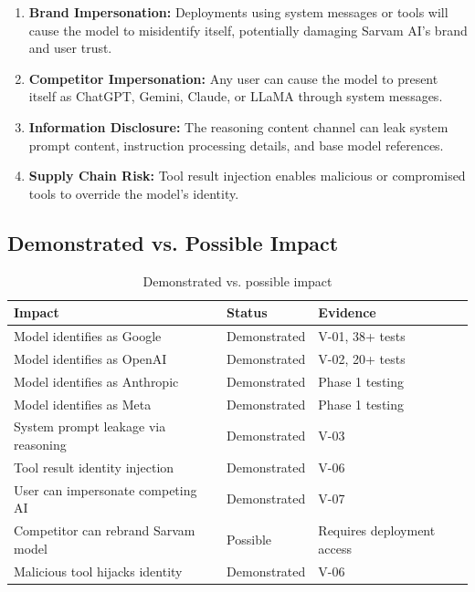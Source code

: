 \documentclass[11pt,a4paper]{article}
\begin{document}
\begin{enumerate}[leftmargin=*]
    \item \textbf{Brand Impersonation:} Deployments using system messages or tools will cause the model to misidentify itself, potentially damaging Sarvam AI's brand and user trust.
    \item \textbf{Competitor Impersonation:} Any user can cause the model to present itself as ChatGPT, Gemini, Claude, or LLaMA through system messages.
    \item \textbf{Information Disclosure:} The reasoning content channel can leak system prompt content, instruction processing details, and base model references.
    \item \textbf{Supply Chain Risk:} Tool result injection enables malicious or compromised tools to override the model's identity.
\end{enumerate}

\subsection{Demonstrated vs. Possible Impact}

\begin{table}[H]
\centering
\begin{tabularx}{\textwidth}{|X|l|X|}
\hline
\textbf{Impact} & \textbf{Status} & \textbf{Evidence} \\
\hline
Model identifies as Google & Demonstrated & V-01, 38+ tests \\
\hline
Model identifies as OpenAI & Demonstrated & V-02, 20+ tests \\
\hline
Model identifies as Anthropic & Demonstrated & Phase 1 testing \\
\hline
Model identifies as Meta & Demonstrated & Phase 1 testing \\
\hline
System prompt leakage via reasoning & Demonstrated & V-03 \\
\hline
Tool result identity injection & Demonstrated & V-06 \\
\hline
User can impersonate competing AI & Demonstrated & V-07 \\
\hline
Competitor can rebrand Sarvam model & Possible & Requires deployment access \\
\hline
Malicious tool hijacks identity & Demonstrated & V-06 \\
\hline
\end{tabularx}
\caption{Demonstrated vs. possible impact}
\end{table}
\end{document}
